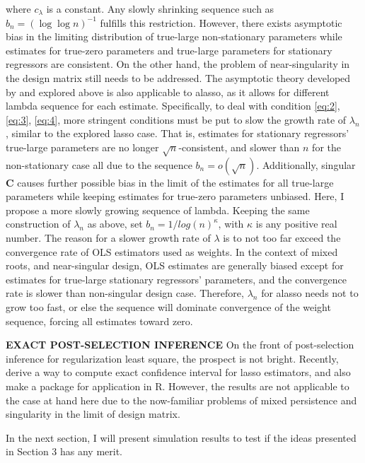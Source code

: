 \documentclass[12pt,a4paper]{article}
\begin{document}
where $ c_\lambda $ is a constant. Any slowly shrinking sequence such as $ b_n = (\log \log n)^{- 1} $ fulfills this restriction. However, there exists asymptotic bias in the limiting distribution of true-large non-stationary parameters while estimates for true-zero parameters and true-large parameters for stationary regressors are consistent. On the other hand, the problem of near-singularity in the design matrix still needs to be addressed. The asymptotic theory developed by \cite{knight2008shrinkage} and explored above is also applicable to alasso, as it allows for different lambda sequence for each estimate. Specifically, to deal with condition \eqref{eq:2}, \eqref{eq:3}, \eqref{eq:4}, more stringent conditions must be put to slow the growth rate of $ \lambda_n $, similar to the explored lasso case. That is, estimates for stationary regressors' true-large parameters are no longer $ \sqrt{n} $-consistent, and slower than $ n $ for the non-stationary case all due to the sequence $ b_n = o(\sqrt{n}) $. Additionally, singular $ \bm{C} $ causes further possible bias in the limit of the estimates for all true-large parameters while keeping estimates for true-zero parameters unbiased. Here, I propose a more slowly growing sequence of lambda. Keeping the same construction of $ \lambda_n $ as above, set $ b_n =  1 / log(n)^\kappa $, with $ \kappa $ is any positive real number. The reason for a slower growth rate of $ \lambda $ is to not too far exceed the convergence rate of OLS estimators used as weights. In the context of mixed roots, and near-singular design, OLS estimates are generally biased except for estimates for true-large stationary regressors' parameters, and the convergence rate is slower than non-singular design case. Therefore, $ \lambda_n $ for alasso needs not to grow too fast, or else the sequence will dominate convergence of the weight sequence, forcing all estimates toward zero.

\textbf{EXACT POST-SELECTION INFERENCE} On the front of post-selection inference for regularization least square, the prospect is not bright. Recently, \cite{lee2016exact} derive a way to compute exact confidence interval for lasso estimators, and also make a package for application in R. However, the results are not applicable to the case at hand here due to the now-familiar problems of mixed persistence and singularity in the limit of design matrix.

In the next section, I will present simulation results to test if the ideas presented in Section 3 has any merit.
\end{document}
